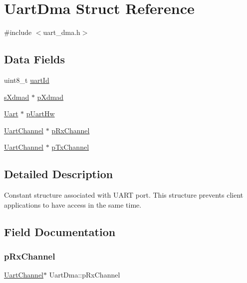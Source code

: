 \hypertarget{structUartDma}{}\section{Uart\+Dma Struct Reference}
\label{structUartDma}


{\ttfamily \#include $<$uart\+\_\+dma.\+h$>$}

\subsection*{Data Fields}
\begin{DoxyCompactItemize}
\item 
uint8\+\_\+t \mbox{\hyperlink{structUartDma_aeec7e45717b2903b4cb2c1cfa6f3855f}{uart\+Id}}
\item 
\mbox{\hyperlink{group__dmad__structs_gaf2c13151514615a6beb35c0d868a5053}{s\+Xdmad}} $\ast$ \mbox{\hyperlink{structUartDma_aa9d4edd1ae2284162ab7ab1d199f3cf3}{p\+Xdmad}}
\item 
\mbox{\hyperlink{structUart}{Uart}} $\ast$ \mbox{\hyperlink{structUartDma_a78da94bb981cda7cb36a738868326e77}{p\+Uart\+Hw}}
\item 
\mbox{\hyperlink{structUartChannel}{Uart\+Channel}} $\ast$ \mbox{\hyperlink{structUartDma_a909cc0e14f0271d6d8cbefa0c49195e5}{p\+Rx\+Channel}}
\item 
\mbox{\hyperlink{structUartChannel}{Uart\+Channel}} $\ast$ \mbox{\hyperlink{structUartDma_a7f0497429070ce75403395c6b6e6a31b}{p\+Tx\+Channel}}
\end{DoxyCompactItemize}


\subsection{Detailed Description}
Constant structure associated with U\+A\+RT port. This structure prevents client applications to have access in the same time. 

\subsection{Field Documentation}
\mbox{\label{structUartDma_a909cc0e14f0271d6d8cbefa0c49195e5}} 
\subsubsection{\texorpdfstring{pRxChannel}{pRxChannel}}
{\footnotesize\ttfamily \mbox{\hyperlink{structUartChannel}{Uart\+Channel}}$\ast$ Uart\+Dma\+::p\+Rx\+Channel}

